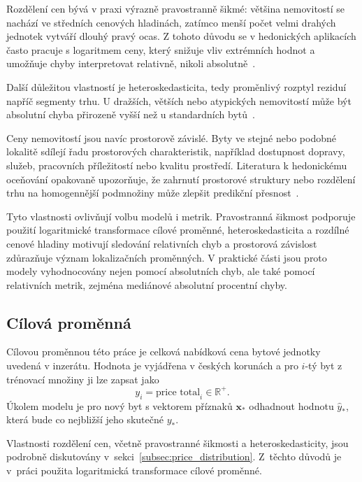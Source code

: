 Rozdělení cen bývá v praxi výrazně pravostranně šikmé: většina nemovitostí se nachází ve středních cenových hladinách, zatímco menší počet velmi drahých jednotek vytváří dlouhý pravý ocas. Z tohoto důvodu se v hedonických aplikacích často pracuje s logaritmem ceny, který snižuje vliv extrémních hodnot a umožňuje chyby interpretovat relativně, nikoli absolutně~\cite{GoodmanThibodeau2003,Miller2022HedonicGAM}.

Další důležitou vlastností je heteroskedasticita, tedy proměnlivý rozptyl reziduí napříč segmenty trhu. U dražších, větších nebo atypických nemovitostí může být absolutní chyba přirozeně vyšší než u standardních bytů~\cite{Fletcher2000Heteroscedasticity,Stevenson2004Heteroscedasticity}.

Ceny nemovitostí jsou navíc prostorově závislé. Byty ve stejné nebo podobné lokalitě sdílejí řadu prostorových charakteristik, například dostupnost dopravy, služeb, pracovních příležitostí nebo kvalitu prostředí. Literatura k hedonickému oceňování opakovaně upozorňuje, že zahrnutí prostorové struktury nebo rozdělení trhu na homogennější podmnožiny může zlepšit predikční přesnost~\cite{GoodmanThibodeau2003,Muto2023Spatiotemporal}.

Tyto vlastnosti ovlivňují volbu modelů i metrik. Pravostranná šikmost podporuje použití logaritmické transformace cílové proměnné, heteroskedasticita a rozdílné cenové hladiny motivují sledování relativních chyb a prostorová závislost zdůrazňuje význam lokalizačních proměnných. V praktické části jsou proto modely vyhodnocovány nejen pomocí absolutních chyb, ale také pomocí relativních metrik, zejména mediánové absolutní procentní chyby.

\subsection{Cílová proměnná}
\label{subsec:target_variable}

Cílovou proměnnou této práce je celková nabídková cena bytové jednotky uvedená v inzerátu. Hodnota je vyjádřena v českých korunách a pro \(i\)-tý byt z trénovací množiny ji lze zapsat jako
\begin{equation}
    y_i = \text{price total}_i \in \mathbb{R}^+.
\end{equation}
Úkolem modelu je pro nový byt s vektorem příznaků \(\mathbf{x}_*\) odhadnout hodnotu \(\hat{y}_*\), která bude co nejbližší jeho skutečné \(y_*\).

Vlastnosti rozdělení cen, včetně pravostranné šikmosti a heteroskedasticity, jsou podrobně diskutovány v~sekci~\ref{subsec:price_distribution}. Z~těchto důvodů je v~práci použita logaritmická transformace cílové proměnné.

